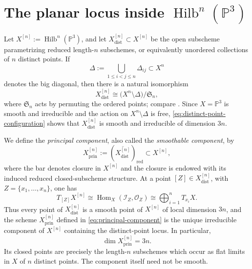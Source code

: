 \documentclass[12pt]{amsart}
\numberwithin{equation}{section}
\newcommand{\PP}{\mathbb{P}}
\newcommand{\OO}{\mathcal{O}}
\newcommand{\I}{\mathcal{I}}
\newcommand{\Hilb}{\operatorname{Hilb}}
\newcommand{\Hom}{\operatorname{Hom}}
\theoremstyle{plain}
\theoremstyle{definition}
\theoremstyle{remark}
\begin{document}
\section{The planar locus inside $\Hilb^n(\PP^3)$}\label{sec:locus}

Let $X^{[n]}:=\Hilb^n(\PP^3)$, and let $X^{[n]}_{\mathrm{dist}}\subset X^{[n]}$ be the open subscheme parametrizing reduced length-$n$ subschemes, or equivalently unordered collections of $n$ distinct points.
If
\[
\Delta:=\bigcup_{1\leq i<j\leq n}\Delta_{ij}\subset X^n
\]
denotes the big diagonal, then there is a natural isomorphism
\begin{equation}\label{eq:distinct-point-configuration}
X^{[n]}_{\mathrm{dist}}
\cong
\bigl(X^n\setminus\Delta\bigr)/\mathfrak S_n,
\end{equation}
where $\mathfrak S_n$ acts by permuting the ordered points; compare \cite[\S~1.1]{Nakajima}.
Since $X=\PP^3$ is smooth and irreducible and the action on $X^n\setminus\Delta$ is free, \eqref{eq:distinct-point-configuration} shows that $X^{[n]}_{\mathrm{dist}}$ is smooth and irreducible of dimension $3n$.

We define the \emph{principal component}, also called the \emph{smoothable component}, by
\begin{equation}\label{eq:principal-component}
X^{[n]}_{\mathrm{prin}}
:=
\left(\overline{X^{[n]}_{\mathrm{dist}}}\right)_{\mathrm{red}}
\subset X^{[n]},
\end{equation}
where the bar denotes closure in $X^{[n]}$ and the closure is endowed with its induced reduced closed-subscheme structure.
At a point $[Z]\in X^{[n]}_{\mathrm{dist}}$, with $Z=\{x_1,\ldots,x_n\}$, one has
\[
T_{[Z]}X^{[n]}
\cong
\Hom_X(\I_Z,\OO_Z)
\cong
\bigoplus_{i=1}^n T_{x_i}X.
\]
Thus every point of $X^{[n]}_{\mathrm{dist}}$ is a smooth point of $X^{[n]}$ of local dimension $3n$, and the scheme $X^{[n]}_{\mathrm{prin}}$ defined in \eqref{eq:principal-component} is the unique irreducible component of $X^{[n]}$ containing the distinct-point locus.  In particular,
\[
\dim X^{[n]}_{\mathrm{prin}}=3n.
\]
Its closed points are precisely the length-$n$ subschemes which occur as flat limits in $X$ of $n$ distinct points.  The component itself need not be smooth.
\end{document}
